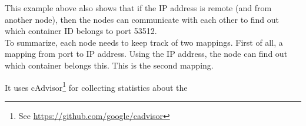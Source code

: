 \noindent
This example above also shows that if the IP address is remote (and from another node), then the nodes can communicate with each other to find out which container ID belongs to port 53512.\\

\noindent
To summarize, each node needs to keep track of two mappings. First of all, a mapping from port to IP address. Using the IP address, the node can find out which container belongs this. This is the second mapping.



It uses cAdvisor\footnote{See \url{https://github.com/google/cadvisor}} for collecting statistics about the 
